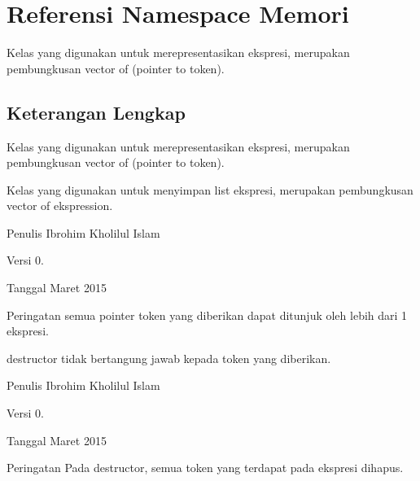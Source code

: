 \hypertarget{namespaceMemori}{}\section{Referensi Namespace Memori}
\label{namespaceMemori}


Kelas yang digunakan untuk merepresentasikan ekspresi, merupakan pembungkusan vector of (pointer to token).  




\subsection{Keterangan Lengkap}
Kelas yang digunakan untuk merepresentasikan ekspresi, merupakan pembungkusan vector of (pointer to token). 

Kelas yang digunakan untuk menyimpan list ekspresi, merupakan pembungkusan vector of ekspression.

\begin{DoxyAuthor}{Penulis}
Ibrohim Kholilul Islam 
\end{DoxyAuthor}
\begin{DoxyVersion}{Versi}
0. 
\end{DoxyVersion}
\begin{DoxyDate}{Tanggal}
Maret 2015 
\end{DoxyDate}
\begin{DoxyWarning}{Peringatan}
semua pointer token yang diberikan dapat ditunjuk oleh lebih dari 1 ekspresi. 

destructor tidak bertangung jawab kepada token yang diberikan.
\end{DoxyWarning}
\begin{DoxyAuthor}{Penulis}
Ibrohim Kholilul Islam 
\end{DoxyAuthor}
\begin{DoxyVersion}{Versi}
0. 
\end{DoxyVersion}
\begin{DoxyDate}{Tanggal}
Maret 2015 
\end{DoxyDate}
\begin{DoxyWarning}{Peringatan}
Pada destructor, semua token yang terdapat pada ekspresi dihapus. 
\end{DoxyWarning}
